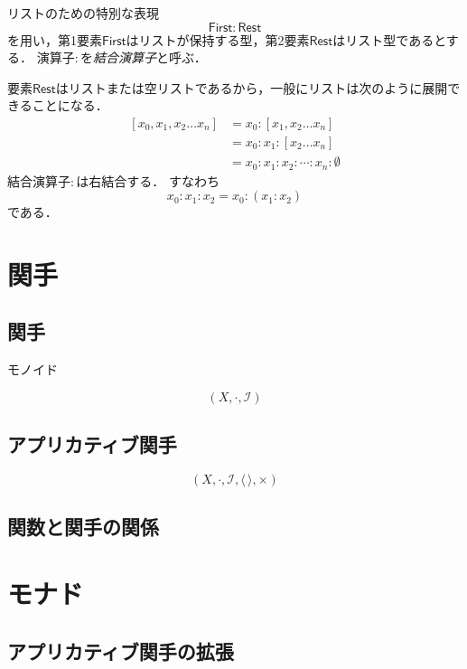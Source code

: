 \documentclass[twocolumn]{jsbook}
\newcommand{\keyword}[1]{\emph{#1}}
\newcommand{\constantempty}{\emptyset}
\newcommand{\binaryfunctormap}{\cdot}
\newcommand{\binaryconcat}{:}
\newcommand{\listtype}[1]{\left[#1\right]}
\newcommand{\rangedots}{\dots}
\newcommand{\specialwordname}[1]{\mathsf{#1}}
\newcommand{\specialwordfirst}{\specialwordname{First}}
\newcommand{\specialwordrest}{\specialwordname{Rest}}
\newcommand{\mathidentitymorph}{\mathcal{I}}
\begin{document}
リストのための特別な表現$$\specialwordfirst\binaryconcat\specialwordrest$$を用い，第1要素$\specialwordfirst$はリストが保持する型，第2要素$\specialwordrest$はリスト型であるとする．
演算子$\binaryconcat$を\keyword{結合演算子}と呼ぶ．

要素$\specialwordrest$はリストまたは空リストであるから，一般にリストは次のように展開できることになる．
\begin{align*}
\listtype{x_0,x_1,x_2\rangedots x_n}&=x_0\binaryconcat\listtype{x_1,x_2\rangedots x_n}\\
&=x_0\binaryconcat x_1\binaryconcat\listtype{x_2\rangedots x_n}\\
&=x_0\binaryconcat x_1\binaryconcat x_2\binaryconcat\dotsb\binaryconcat x_n\binaryconcat\constantempty
\end{align*}
結合演算子$\binaryconcat$は右結合する．
すなわち$$x_0\binaryconcat x_1\binaryconcat x_2=x_0\binaryconcat(x_1\binaryconcat x_2)$$である．


\chapter{関手}

\section{関手}

モノイド

$$(X,\binaryfunctormap,\mathidentitymorph)$$

\section{アプリカティブ関手}

$$(X,\binaryfunctormap,\mathidentitymorph,\langle\,\rangle,\times)$$


\section{関数と関手の関係}

\chapter{モナド}

\section{アプリカティブ関手の拡張}
\end{document}

